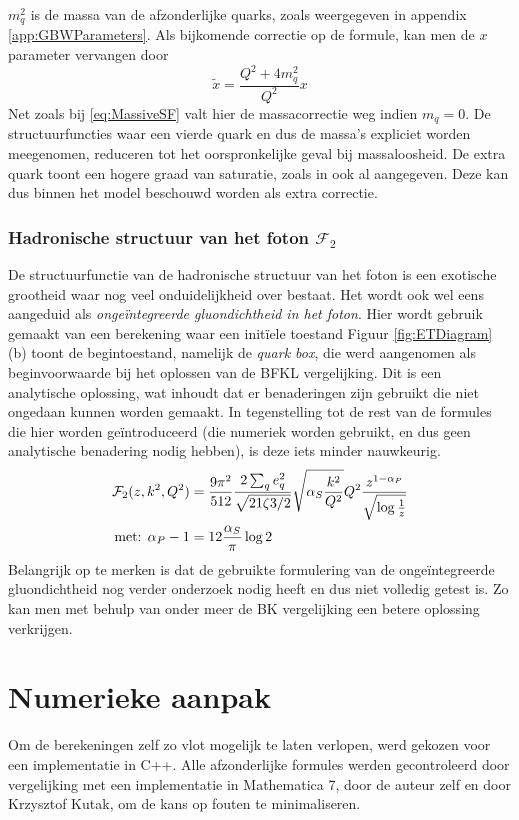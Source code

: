 \documentclass[a4paper,11pt]{article}
\numberwithin{equation}{section} %
\begin{document}
$m_q^2$ is de massa van de afzonderlijke quarks, zoals weergegeven in appendix \ref{app:GBWParameters}.
Als bijkomende correctie op de formule, kan men de $x$ parameter vervangen door
\begin{equation}
\tilde{x} = \frac{Q^2+ 4 m_q^2}{Q^2} x 
\end{equation}
Net zoals bij \ref{eq:MassiveSF} valt hier de massacorrectie weg indien $m_q=0$.
De structuurfuncties waar een vierde quark en dus de massa’s expliciet worden meegenomen, reduceren tot het oorspronkelijke geval bij massaloosheid.
De extra quark toont een hogere graad van saturatie, zoals in \cite{GBW} ook al aangegeven.
Deze kan dus binnen het model beschouwd worden als extra correctie.

    \subsubsection{Hadronische structuur van het foton $\mathcal{F}_2$} \label{sec:UGDPhoton}
De structuurfunctie van de hadronische structuur van het foton is een exotische grootheid waar nog veel onduidelijkheid over bestaat.
Het wordt ook wel eens aangeduid als \textit{ongeïntegreerde gluondichtheid in het foton}.
Hier wordt gebruik gemaakt van een berekening waar een initïele toestand
Figuur \ref{fig:ETDiagram} (b) toont de begintoestand, namelijk de \textit{quark box}, die werd aangenomen als beginvoorwaarde bij het oplossen van de BFKL vergelijking.
Dit is een analytische oplossing, wat inhoudt dat er benaderingen zijn gebruikt die niet ongedaan kunnen worden gemaakt.
In tegenstelling tot de rest van de formules die hier worden geïntroduceerd (die numeriek worden gebruikt, en dus geen analytische benadering nodig hebben), is deze iets minder nauwkeurig.
\begin{align} \label{eq:UGDPhoton}
\mathcal{F}_2(z,k^2,Q^2) &= \frac{9\pi^2}{512} \frac{2\sum_q e_q^2}{\sqrt{21\zeta{3}/2}} \sqrt{\alpha_S \frac{k^2}{Q^2}} Q^2 \frac{z^{1-\alpha_P}}{\sqrt{\log{\frac{1}{z}}}} \\
\text{met: } \alpha_P -1 &=  12  \frac{\alpha_S}{\pi} \log{2} \notag
\end{align}
Belangrijk op te merken is dat de gebruikte formulering van de ongeïntegreerde gluondichtheid nog verder onderzoek nodig heeft en dus niet volledig getest is.
Zo kan men met behulp van onder meer de BK vergelijking een betere oplossing verkrijgen.

\section{Numerieke aanpak}
Om de berekeningen zelf zo vlot mogelijk te laten verlopen, werd gekozen voor een implementatie in C++.
Alle afzonderlijke formules werden gecontroleerd door vergelijking met een implementatie in Mathematica 7, door de auteur zelf en door Krzysztof Kutak, om de kans op fouten te minimaliseren.
\end{document}
